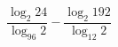 \begin{ex}[type=calculate]
	\begin{condition}
		\( \dfrac{\log_2 24}{\log_{96} 2}-\dfrac{\log_2 192}{\log_{12} 2} \)
	\end{condition}
\end{ex}